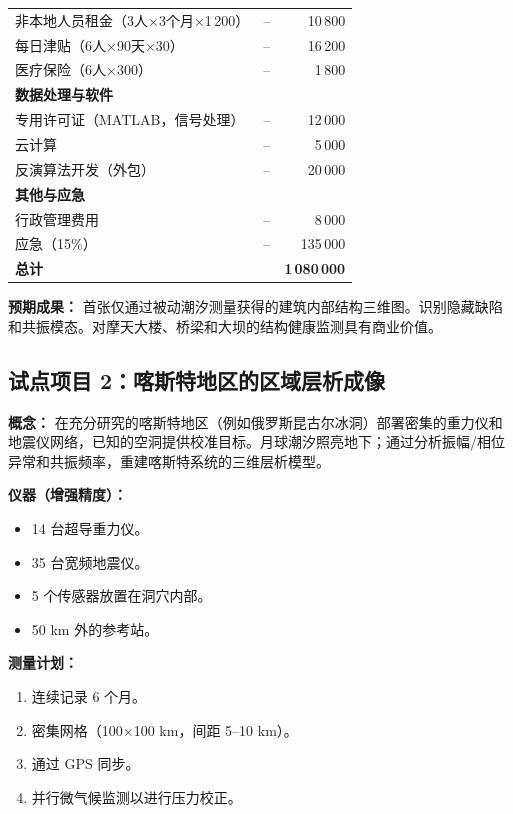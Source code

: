 \documentclass[12pt,a4paper]{article}
\theoremstyle{remark}
\begin{document}
\begin{table}[htbp]
\begin{tabular}{lrr}
			非本地人员租金（3人$\times$3个月$\times$1\,200） & – & 10\,800 \\
			每日津贴（6人$\times$90天$\times$30） & – & 16\,200 \\
			医疗保险（6人$\times$300） & – & 1\,800 \\
			\multicolumn{3}{l}{\textbf{数据处理与软件}} \\
			专用许可证（MATLAB，信号处理） & – & 12\,000 \\
			云计算 & – & 5\,000 \\
			反演算法开发（外包） & – & 20\,000 \\
			\multicolumn{3}{l}{\textbf{其他与应急}} \\
			行政管理费用 & – & 8\,000 \\
			应急（15\%） & – & 135\,000 \\
			\midrule
			\textbf{总计} & & \textbf{1\,080\,000} \\
			\bottomrule
		\end{tabular}
	\end{table}
	
	\textbf{预期成果：} 首张仅通过被动潮汐测量获得的建筑内部结构三维图。识别隐藏缺陷和共振模态。对摩天大楼、桥梁和大坝的结构健康监测具有商业价值。
	
	\subsection{试点项目 2：喀斯特地区的区域层析成像}
	
	\textbf{概念：} 在充分研究的喀斯特地区（例如俄罗斯昆古尔冰洞）部署密集的重力仪和地震仪网络，已知的空洞提供校准目标。月球潮汐照亮地下；通过分析振幅/相位异常和共振频率，重建喀斯特系统的三维层析模型。
	
	\textbf{仪器（增强精度）：}
	\begin{itemize}
		\item 14 台超导重力仪。
		\item 35 台宽频地震仪。
		\item 5 个传感器放置在洞穴内部。
		\item 50 km 外的参考站。
	\end{itemize}
	
	\textbf{测量计划：}
	\begin{enumerate}
		\item 连续记录 6 个月。
		\item 密集网格（100$\times$100 km，间距 5–10 km）。
		\item 通过 GPS 同步。
		\item 并行微气候监测以进行压力校正。
	\end{enumerate}
	
\end{document}
